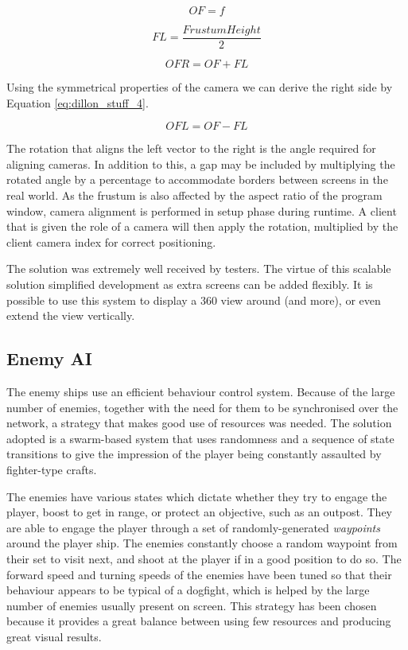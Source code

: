 \documentclass[a4paper,11pt]{article}
\begin{document}
\begin{equation}
	OF = f
	\label{eq:dillon_stuff_1}
\end{equation}

\begin{equation}
	FL =\frac{Frustum Height}{2}
    \label{eq:dillon_stuff_2}
\end{equation}

\begin{equation}
	OFR = OF + FL
    \label{eq:dillon_stuff_3}
\end{equation}

Using the symmetrical properties of the camera we can derive the right side by Equation \ref{eq:dillon_stuff_4}.

\begin{equation}
	OFL = OF - FL
	\label{eq:dillon_stuff_4}
\end{equation}

The rotation that aligns the left vector to the right is the angle required for aligning cameras. In addition to this, a gap may be included by multiplying the rotated angle by a percentage to accommodate borders between screens in the real world. As the frustum is also affected by the aspect ratio of the program window, camera alignment is performed in setup phase during runtime. A client that is given the role of a camera will then apply the rotation, multiplied by the client camera index for correct positioning.

The solution was extremely well received by testers. The virtue of this scalable solution simplified development as extra screens can be added flexibly. It is possible to use this system to display a 360 view around (and more), or even extend the view vertically.


\subsection{Enemy AI}
The enemy ships use an efficient behaviour control system. Because of the large number of enemies, together with the need for them to be synchronised over the network, a strategy that makes good use of resources was needed. The solution adopted is a swarm-based system that uses randomness and a sequence of state transitions to give the impression of the player being constantly assaulted by fighter-type crafts. 

The enemies have various states which dictate whether they try to engage the player, boost to get in range, or protect an objective, such as an outpost. They are able to engage the player through a set of randomly-generated \emph{waypoints} around the player ship. The enemies constantly choose a random waypoint from their set to visit next, and shoot at the player if in a good position to do so. The forward speed and turning speeds of the enemies have been tuned so that their behaviour appears to be typical of a dogfight, which is helped by the large number of enemies usually present on screen. This strategy has been chosen because it provides a great balance between using few resources and producing great visual results.
\end{document}
